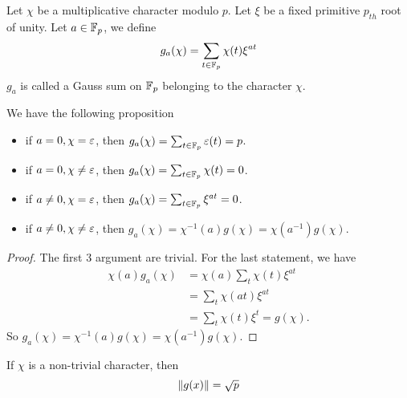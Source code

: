 \begin{definition}
Let $\chi$ be a multiplicative character modulo $p$. Let $\xi$ be a fixed primitive $p_{th}$ root of unity. Let $a\in\mathbb{F}_p$, we define
$$g_a(\chi) = \sum_{t\in \mathbb{F}_p}\chi(t)\xi^{at}$$ $g_a$ is called a Gauss sum on $\mathbb{F}_p$ belonging to the character $\chi$.
\end{definition}
We have the following proposition
\begin{proposition}\mbox{}
\begin{itemize}
	\item
	if $a=0,\chi=\varepsilon$, then $g_a(\chi) = \sum_{t\in\mathbb{F}_p}\varepsilon(t)=p$.
	\item
	if $a=0,\chi\ne\varepsilon$, then $g_a(\chi) = \sum_{t\in\mathbb{F}_p}\chi(t)=0$.
	\item
	if $a\ne0,\chi=\varepsilon$, then $g_a(\chi) = \sum_{t\in\mathbb{F}_p}\xi^{at}=0$.
	\item
	if $a\ne0,\chi\ne\varepsilon$, then $g_a(\chi) = \chi^{-1}(a)g(\chi)=\chi(a^{-1})g(\chi)$.
\end{itemize}
\end{proposition}
\begin{proof}
The first $3$ argument are trivial. For the last statement, we have
\begin{align*}
\chi(a)g_a(\chi) &= \chi(a)\sum_t\chi(t)\xi^{at}\\
&= \sum_t\chi(at)\xi^{at}\\
&= \sum_t\chi(t)\xi^t = g(\chi).
\end{align*}
So $g_a(\chi) = \chi^{-1}(a)g(\chi)=\chi(a^{-1})g(\chi).$
\end{proof}
\begin{theorem}
If $\chi$ is a non-trivial character, then 
$$\|g(x)\|=\sqrt{p}$$
\end{theorem}
